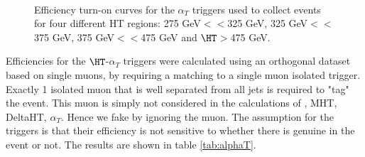 \begin{figure}[!h]
  \begin{center}
     \\
    \caption{Efficiency turn-on curves for the $\alpha_T$ triggers used to collect events for four different HT regions: 275 GeV$<$\HT$<$325 GeV,
             325 GeV$<$\HT$<$375 GeV, 375 GeV$<$\HT$<$475 GeV and $\HT$$>$475 GeV.}
    \label{fig:alphaT}
  \end{center}
\end{figure}

 

Efficiencies for the $\HT$-$\alpha_T$ triggers were calculated using an orthogonal dataset
based on single muons, by requiring a matching to a single muon isolated trigger. Exactly 1
isolated muon that is well separated from all jets is required to "tag" the event. This muon
is simply not considered in the calculations of \HT, MHT, DeltaHT, $\alpha_T$. Hence we fake \MET
by ignoring the muon. The assumption for the \HT triggers is that their efficiency is not
sensitive to whether there is genuine \MET in the event or not. The results are shown in table \ref{tab:alphaT}.


\begin{table}[tbp]
\caption{Measured efficiencies of the $\HT$-$\alpha_T$ triggers, for relevant analysis bins.}
\label{tab:alphaT}
\begin{center}
\end{center}
\end{table}


